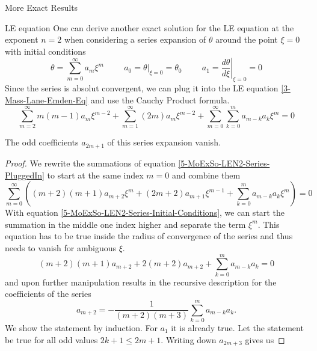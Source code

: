 \begin{section}{More Exact Results}
\begin{subsection}{LE equation}
One can derive another exact solution for the LE equation at the exponent $n=2$ when considering a series expansion of $\theta$ around the point $\xi=0$ with initial conditions
\begin{equation}
	\theta=\sum\limits_{m=0}^\infty a_m\xi^m \hspace{1cm} a_0=\left.\theta\right|_{\xi=0}=\theta_0 \hspace{1cm} a_1=\left.\frac{d\theta}{d\xi}\right|_{\xi=0}=0
	\label{5-MoExSo-LEN2-Series-Initial-Conditions}
\end{equation}
Since the series is absolut convergent, we can plug it into the LE equation \ref{3-Mass-Lane-Emden-Eq} and use the Cauchy Product formula.
\begin{equation}
	\sum\limits_{m=2}^\infty m(m-1)a_m\xi^{m-2}+\sum\limits_{m=1}^\infty (2m)a_m\xi^{m-2} + \sum\limits_{m=0}^\infty\sum\limits_{k=0}^m a_{m-k}a_k\xi^m = 0
	\label{5-MoExSo-LEN2-Series-PluggedIn}
\end{equation}
\begin{theorem}
	The odd coefficients $a_{2m+1}$ of this series expansion vanish.
\end{theorem}
\begin{proof}
	We rewrite the summations of equation \ref{5-MoExSo-LEN2-Series-PluggedIn} to start at the same index $m=0$ and combine them
	\begin{equation}
		\sum\limits_{m=0}^\infty\left((m+2)(m+1)a_{m+2}\xi^{m}+(2m+2)a_{m+1}\xi^{m-1} + \sum\limits_{k=0}^m a_{m-k}a_k\xi^m\right) = 0
	\end{equation}
	With equation \ref{5-MoExSo-LEN2-Series-Initial-Conditions}, we can start the summation in the middle one index higher and separate the term $\xi^m$. This equation has to be true inside the radius of convergence of the series and thus needs to vanish for ambiguous $\xi$.
	\begin{equation}
		(m+2)(m+1)a_{m+2}+2(m+2)a_{m+2}+\sum\limits_{k=0}^ma_{m-k}a_k = 0
	\end{equation}
	and upon further manipulation results in the recursive description for the coefficients of the series
	\begin{equation}
		a_{m+2} = -\frac{1}{(m+2)(m+3)}\sum\limits_{k=0}^ma_{m-k}a_k.
		\label{5-MoExSo-LEN2-Recursive-Coefficients}
	\end{equation}
	We show the statement by induction. For $a_1$ it is already true. Let the statement be true for all odd values $2k+1\leq2m+1$. Writing down $a_{2m+3}$ gives us

\end{proof}
\end{subsection}
\end{section}
